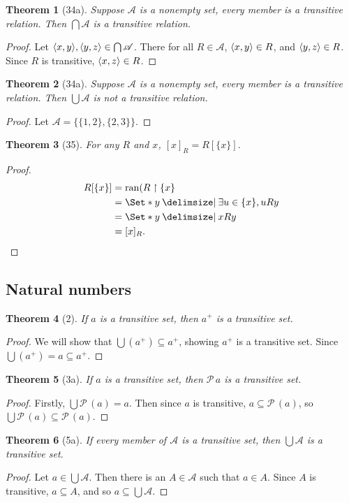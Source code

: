 \documentclass[12pt]{article}
\theoremstyle{plain}
\newtheorem*{exthm}{Theorem}
\theoremstyle{remark}
\theoremstyle{definition}
\theoremstyle{remark}
\newcommand{\powerset}{\mathscr{P}\,}
\providecommand\st{}
\newcommand\SetSymbol[1][]{%
  \nonscript\:#1\vert%
  \allowbreak%
  \nonscript\:
\mathopen{}}
\DeclarePairedDelimiter{\ang}{\langle}{\rangle}
\renewcommand\st{\SetSymbol[\delimsize]}
\DeclareMathOperator{\ran}{ran}
\begin{document}
\begin{exthm}[34a]
  Suppose $\mathscr{A}$ is a nonempty set, every member is a transitive relation. Then $\bigcap \mathscr{A}$ is a transitive relation.
\end{exthm}
\begin{proof}
  Let $\ang{x,y}, \ang{y,z} \in \bigcap \mathscr{A}$. There for all $R \in \mathscr{A}$, $\ang{x,y} \in R$, and $\ang{y,z} \in R$. Since $R$ is transitive, $\ang{x, z} \in R$.
\end{proof}

\begin{exthm}[34a]
  Suppose $\mathscr{A}$ is a nonempty set, every member is a transitive relation. Then $\bigcup \mathscr{A}$ is not a transitive relation.
\end{exthm}
\begin{proof}
  Let $\mathscr{A} = \{\{1, 2\}, \{2, 3\}\}$.
\end{proof}

\begin{exthm}[35]
  For any $R$ and $x$, $[x]_R = R[\{x\}]$.
\end{exthm}
\begin{proof}
  \begin{align*}
    R[\{x\}] &= \ran(R \restriction \{x\}\\
             &= \Set*{y \st \exists u \in \{x\}, uRy}\\
             &= \Set*{y \st xRy}\\
             &= [x]_R.
  \end{align*}
\end{proof}

\subsection{Natural numbers}
\begin{exthm}[2]
  If $a$ is a transitive set, then $a^+$ is a transitive set.
\end{exthm}
\begin{proof}
  We will show that $\bigcup (a^+) \subseteq a^+$, showing $a^+$ is a transitive set. Since $\bigcup (a^+) = a \subseteq a^+$.
\end{proof}

\begin{exthm}[3a]
  If $a$ is a transitive set, then $\powerset a$ is a transitive set.
\end{exthm}
\begin{proof}
  Firstly, $\bigcup \powerset(a) = a$. Then since $a$ is transitive, $a \subseteq \powerset(a)$, so $\bigcup \powerset(a) \subseteq \powerset(a)$.
\end{proof}

\begin{exthm}[5a]
  If every member of $\mathscr{A}$ is a transitive set, then $\bigcup \mathscr{A}$ is a transitive set.
\end{exthm}
\begin{proof}
  Let $a \in \bigcup \mathscr{A}$. Then there is an $A \in \mathscr{A}$ such that $a \in A$. Since $A$ is transitive, $a \subseteq A$, and so $a \subseteq \bigcup \mathscr{A}$.
\end{proof}
\end{document}
